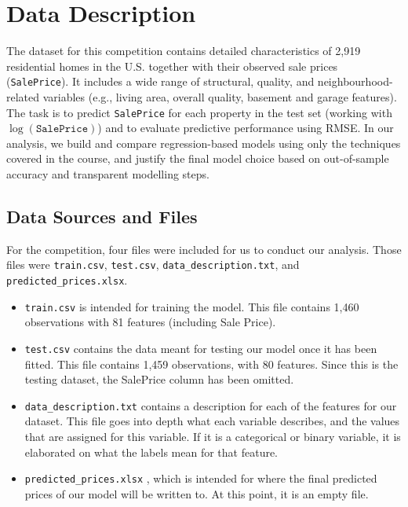 \documentclass[12pt,oneside]{article} %
\begin{document}
\section{Data Description}

\noindent
The dataset for this competition contains detailed characteristics of 2{,}919 residential homes in the U.S. together with their observed sale prices (\texttt{SalePrice}). It includes a wide range of structural, quality, and neighbourhood-related variables (e.g., living area, overall quality, basement and garage features).\\

\noindent
The task is to predict \texttt{SalePrice} for each property in the test set (working with $\log(\texttt{SalePrice})$) and to evaluate predictive performance using RMSE. In our analysis, we build and compare regression-based models using only the techniques covered in the course, and justify the final model choice based on out-of-sample accuracy and transparent modelling steps.



\subsection{Data Sources and Files}

For the competition, four files were included for us to conduct our analysis. Those files were \texttt{train.csv}, \texttt{test.csv}, \texttt{data\_description.txt}, and \texttt{predicted\_prices.xlsx}.

\begin{itemize}
    \item \texttt{train.csv} is intended for training the model. This file contains 1{,}460 observations with 81 features (including Sale Price). 
    
    \item \texttt{test.csv} contains the data meant for testing our model once it has been fitted. This file contains 1,459 observations, with 80 features. Since this is the testing dataset, the SalePrice column has been omitted.
    
    \item \texttt{data\_description.txt} contains a description for each of the features for our dataset. This file goes into depth what each variable describes, and the values that are assigned for this variable. If it is a categorical or binary variable, it is elaborated on what the labels mean for that feature. 
    
    \item \texttt{predicted\_prices.xlsx} , which is intended for where the final predicted prices of our model will be written to. At this point, it is an empty file. 

\end{itemize}
\end{document}
